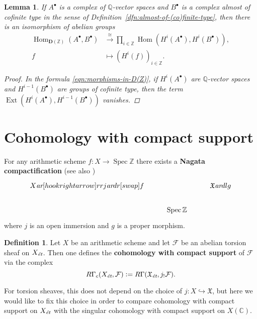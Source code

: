\documentclass[leqno,12pt]{article}
\theoremstyle{plain}
\newtheorem{lemma}[theorem]{\indent\sc Lemma}
\theoremstyle{definition}
\newtheorem{definition}[theorem]{\indent\sc Definition}
\DeclareMathOperator{\Spec}{Spec}
\DeclareMathOperator{\Hom}{Hom}
\DeclareMathOperator{\Ext}{Ext}
\newcommand{\CC}{\mathbb{C}}
\newcommand{\QQ}{\mathbb{Q}}
\newcommand{\ZZ}{\mathbb{Z}}
\newcommand{\dfn}{\mathrel{\mathop:}=}
\newcommand{\ar}{\text{\it ar}}
\newcommand{\et}{\text{\it \'{e}t}}
\newcommand{\DZ}{{\mathbf{D} (\ZZ)}}
\begin{document}
\begin{lemma}
  \label{lemma:morphisms-in-DAb-between-cplx-of-Q-vs-and-almost-cofinite-type-cplx}
  If $A^\bullet$ is a complex of $\QQ$-vector spaces and $B^\bullet$ is a
  complex almost of cofinite type in the sense of
  Definition~{\rm\ref{dfn:almost-of-(co)finite-type}}, then there is an
  isomorphism of abelian groups
  \begin{align*}
    \Hom_\DZ (A^\bullet, B^\bullet) & \xrightarrow{\cong}
    \prod_{i\in \ZZ} \Hom (H^i (A^\bullet), H^i (B^\bullet)),\\
    f & \mapsto (H^i (f))_{i\in \ZZ}.
  \end{align*}

  \begin{proof}
    In the formula \eqref{eqn:morphisms-in-D(Z)}, if $H^i (A^\bullet)$ are
    $\QQ$-vector spaces and $H^{i-1} (B^\bullet)$ are groups of cofinite type,
    then the term $\Ext (H^i (A^\bullet), H^{i-1} (B^\bullet))$ vanishes.
  \end{proof}
\end{lemma}


\section{Cohomology with compact support}
\label{app:modified-cohomology-with-compact-support}

For any arithmetic scheme $f\colon X\to \Spec \ZZ$ there exists a
\textbf{Nagata compactification}
\cite{Conrad-Deligne-Nagata,Conrad-Deligne-Nagata-erratum}
(see also \cite[Expos\'{e}~XVII]{SGA4})
\[ \begin{tikzcd}
X \ar[hookrightarrow]{rr}{j}\ar{dr}[swap]{f} & & \mathfrak{X} \ar{dl}{g} \\
 & \Spec \ZZ
\end{tikzcd} \]
where $j$ is an open immersion and $g$ is a proper morphism.

\begin{definition}
  Let $X$ be an arithmetic scheme and let $\mathcal{F}$ be an abelian torsion
  sheaf on $X_\et$. Then one defines the
  \textbf{cohomology with compact support} of $\mathcal{F}$ via the complex
  \[
    R\Gamma_c (X_\et, \mathcal{F}) \dfn
    R\Gamma (\mathfrak{X}_\text{\it \'et}, j_! \mathcal{F}).
  \]
\end{definition}

For torsion sheaves, this does not depend on the choice of
$j\colon X \hookrightarrow \mathfrak{X}$, but here we would like to fix this
choice in order to compare cohomology with compact support on $X_\et$ with
the singular cohomology with compact support on $X (\CC)$.
\end{document}
